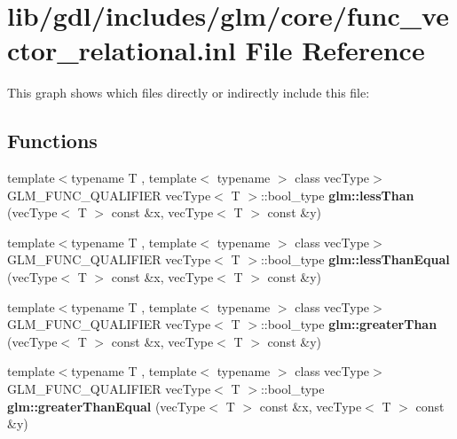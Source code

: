 \hypertarget{func__vector__relational_8inl}{}\section{lib/gdl/includes/glm/core/func\+\_\+vector\+\_\+relational.inl File Reference}
\label{func__vector__relational_8inl}
This graph shows which files directly or indirectly include this file\+:
\subsection*{Functions}
\begin{DoxyCompactItemize}
\item 
\hypertarget{namespaceglm_a5b27d627ccb73d8240b06f424fd08fd5}{}{\footnotesize template$<$typename T , template$<$ typename $>$ class vec\+Type$>$ }\\G\+L\+M\+\_\+\+F\+U\+N\+C\+\_\+\+Q\+U\+A\+L\+I\+F\+I\+E\+R vec\+Type$<$ T $>$\+::bool\+\_\+type {\bfseries glm\+::less\+Than} (vec\+Type$<$ T $>$ const \&x, vec\+Type$<$ T $>$ const \&y)\label{namespaceglm_a5b27d627ccb73d8240b06f424fd08fd5}

\item 
\hypertarget{namespaceglm_a92e02a1a011a6f422168c390e51b273e}{}{\footnotesize template$<$typename T , template$<$ typename $>$ class vec\+Type$>$ }\\G\+L\+M\+\_\+\+F\+U\+N\+C\+\_\+\+Q\+U\+A\+L\+I\+F\+I\+E\+R vec\+Type$<$ T $>$\+::bool\+\_\+type {\bfseries glm\+::less\+Than\+Equal} (vec\+Type$<$ T $>$ const \&x, vec\+Type$<$ T $>$ const \&y)\label{namespaceglm_a92e02a1a011a6f422168c390e51b273e}

\item 
\hypertarget{namespaceglm_acc3192e87d7bb57e9ebb0821b9348de7}{}{\footnotesize template$<$typename T , template$<$ typename $>$ class vec\+Type$>$ }\\G\+L\+M\+\_\+\+F\+U\+N\+C\+\_\+\+Q\+U\+A\+L\+I\+F\+I\+E\+R vec\+Type$<$ T $>$\+::bool\+\_\+type {\bfseries glm\+::greater\+Than} (vec\+Type$<$ T $>$ const \&x, vec\+Type$<$ T $>$ const \&y)\label{namespaceglm_acc3192e87d7bb57e9ebb0821b9348de7}

\item 
\hypertarget{namespaceglm_a25c709f358e879e9fb7c338614c55d30}{}{\footnotesize template$<$typename T , template$<$ typename $>$ class vec\+Type$>$ }\\G\+L\+M\+\_\+\+F\+U\+N\+C\+\_\+\+Q\+U\+A\+L\+I\+F\+I\+E\+R vec\+Type$<$ T $>$\+::bool\+\_\+type {\bfseries glm\+::greater\+Than\+Equal} (vec\+Type$<$ T $>$ const \&x, vec\+Type$<$ T $>$ const \&y)\label{namespaceglm_a25c709f358e879e9fb7c338614c55d30}


\end{DoxyCompactItemize}
